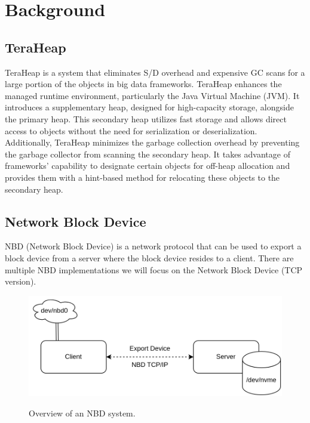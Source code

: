 \section{Background}


\vspace{1em}
\subsection{TeraHeap}
TeraHeap is a system that eliminates S/D overhead and expensive GC scans for a
large portion of the objects in big data frameworks. TeraHeap enhances the
managed runtime environment, particularly the Java Virtual Machine (JVM). It
introduces a supplementary heap, designed for high-capacity storage, alongside
the primary heap. This secondary heap utilizes fast storage and allows direct
access to objects without the need for serialization or deserialization.
Additionally, TeraHeap minimizes the garbage collection overhead by preventing
the garbage collector from scanning the secondary heap. It takes advantage of
frameworks' capability to designate certain objects for off-heap allocation and
provides them with a hint-based method for relocating these objects to the
secondary heap. 

\subsection{Network Block Device}

  NBD (Network Block Device) is a
 network protocol that can be used to export a block device from a server where
 the block device resides to a client. There are multiple NBD implementations
  we will focus on the Network Block
 Device (TCP version).  

  \begin{figure}[h]
    \includegraphics[scale=0.3]{figures/nbd-path.png}\\
    \caption{Overview of an NBD system.}
  \end{figure}


